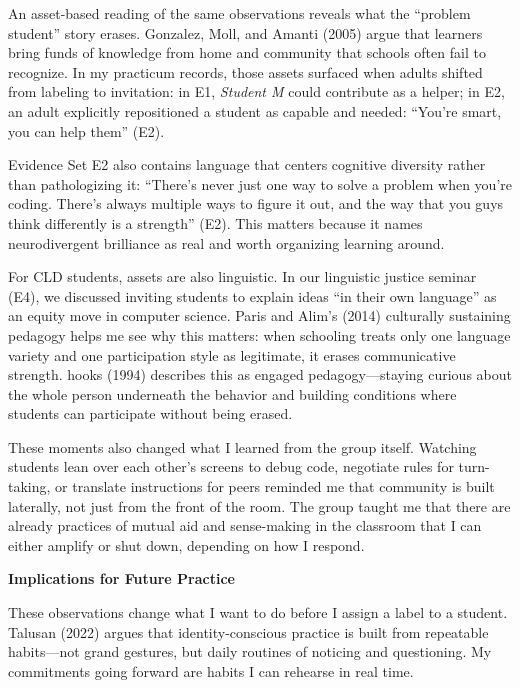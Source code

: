 \documentclass[12pt]{article}
\newcommand{\apaheading}[1]{\begin{center}\textbf{#1}\end{center}}
\newcommand{\EvidenceSet}[1]{\textsc{E#1}}
\begin{document}
An asset-based reading of the same observations reveals what the ``problem student'' story erases. Gonzalez, Moll, and Amanti (2005) argue that learners bring funds of knowledge from home and community that schools often fail to recognize. In my practicum records, those assets surfaced when adults shifted from labeling to invitation: in \EvidenceSet{1}, \textit{Student M} could contribute as a helper; in \EvidenceSet{2}, an adult explicitly repositioned a student as capable and needed: ``You're smart, you can help them'' (\EvidenceSet{2}).

Evidence Set \EvidenceSet{2} also contains language that centers cognitive diversity rather than pathologizing it: ``There's never just one way to solve a problem when you're coding. There's always multiple ways to figure it out, and the way that you guys think differently is a strength'' (\EvidenceSet{2}). This matters because it names neurodivergent brilliance as real and worth organizing learning around.

For CLD students, assets are also linguistic. In our linguistic justice seminar (\EvidenceSet{4}), we discussed inviting students to explain ideas ``in their own language'' as an equity move in computer science. Paris and Alim's (2014) culturally sustaining pedagogy helps me see why this matters: when schooling treats only one language variety and one participation style as legitimate, it erases communicative strength. hooks (1994) describes this as engaged pedagogy---staying curious about the whole person underneath the behavior and building conditions where students can participate without being erased.

These moments also changed what I learned from the group itself. Watching students lean over each other's screens to debug code, negotiate rules for turn-taking, or translate instructions for peers reminded me that community is built laterally, not just from the front of the room. The group taught me that there are already practices of mutual aid and sense-making in the classroom that I can either amplify or shut down, depending on how I respond.

\apaheading{Implications for Future Practice}

These observations change what I want to do before I assign a label to a student. Talusan (2022) argues that identity-conscious practice is built from repeatable habits---not grand gestures, but daily routines of noticing and questioning. My commitments going forward are habits I can rehearse in real time.
\end{document}
